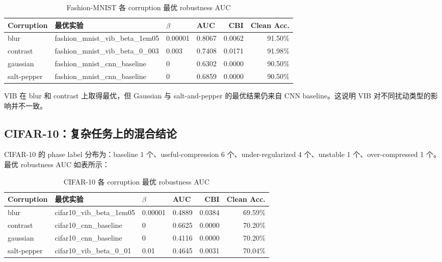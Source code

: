 \documentclass[11pt,a4paper]{article}
\begin{document}
\begin{table}[H]
\centering
\caption{Fashion-MNIST 各 corruption 最优 robustness AUC}
\begin{adjustbox}{max width=\textwidth}
\begin{tabular}{llllrr}
\toprule
Corruption & 最优实验 & $\beta$ & AUC & CBI & Clean Acc. \\
\midrule
blur & fashion\_mnist\_vib\_beta\_1em05 & 0.00001 & 0.8067 & 0.0062 & 91.50\% \\
contrast & fashion\_mnist\_vib\_beta\_0\_003 & 0.003 & 0.7408 & 0.0171 & 91.98\% \\
gaussian & fashion\_mnist\_cnn\_baseline & 0 & 0.6302 & 0.0000 & 90.50\% \\
salt-pepper & fashion\_mnist\_cnn\_baseline & 0 & 0.6859 & 0.0000 & 90.50\% \\
\bottomrule
\end{tabular}
\end{adjustbox}
\end{table}

VIB 在 blur 和 contrast 上取得最优，但 Gaussian 与 salt-and-pepper 的最优结果仍来自 CNN baseline。这说明 VIB 对不同扰动类型的影响并不一致。

\subsection{CIFAR-10：复杂任务上的混合结论}

CIFAR-10 的 phase label 分布为：baseline 1 个、useful-compression 6 个、under-regularized 4 个、unstable 1 个、over-compressed 1 个。最优 robustness AUC 如表所示：

\begin{table}[H]
\centering
\caption{CIFAR-10 各 corruption 最优 robustness AUC}
\begin{adjustbox}{max width=\textwidth}
\begin{tabular}{llllrr}
\toprule
Corruption & 最优实验 & $\beta$ & AUC & CBI & Clean Acc. \\
\midrule
blur & cifar10\_vib\_beta\_1em05 & 0.00001 & 0.4889 & 0.0384 & 69.59\% \\
contrast & cifar10\_cnn\_baseline & 0 & 0.6625 & 0.0000 & 70.20\% \\
gaussian & cifar10\_cnn\_baseline & 0 & 0.4116 & 0.0000 & 70.20\% \\
salt-pepper & cifar10\_vib\_beta\_0\_01 & 0.01 & 0.4645 & 0.0031 & 70.04\% \\
\bottomrule
\end{tabular}
\end{adjustbox}
\end{table}
\end{document}

